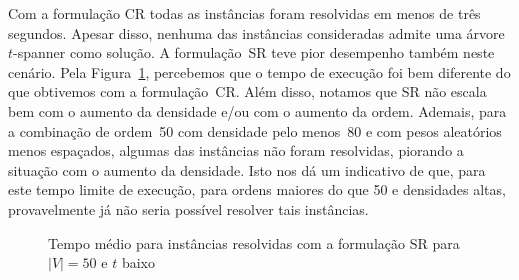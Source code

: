 Com a formulação CR todas as instâncias foram resolvidas em menos de
três segundos. Apesar disso, nenhuma das instâncias consideradas admite
uma árvore $t$-spanner como solução. A formulação~SR teve pior
desempenho também neste cenário.  Pela
Figura~\ref{fig:tree_sf1_1_sf2_s50_aleat}, percebemos que o tempo de
execução foi bem diferente do que obtivemos com a formulação~CR.  Além
disso, notamos que SR não escala bem com o aumento da densidade e/ou
com o aumento da ordem. Ademais, para a combinação de ordem~50 com
densidade pelo menos~80 e com pesos aleatórios menos espaçados,
algumas das instâncias não foram resolvidas, piorando a situação com o
aumento da densidade. Isto nos dá um indicativo de que, para este tempo
limite de execução, para ordens maiores do que 50 e densidades altas,
provavelmente já não seria possível resolver tais instâncias.

\begin{figure}%
    \centering
    \caption{Tempo médio para instâncias resolvidas com a formulação SR para $|V| = 50$ e $t$ baixo}%
    \label{fig:tree_sf1_1_sf2_s50_aleat}%
\end{figure}

